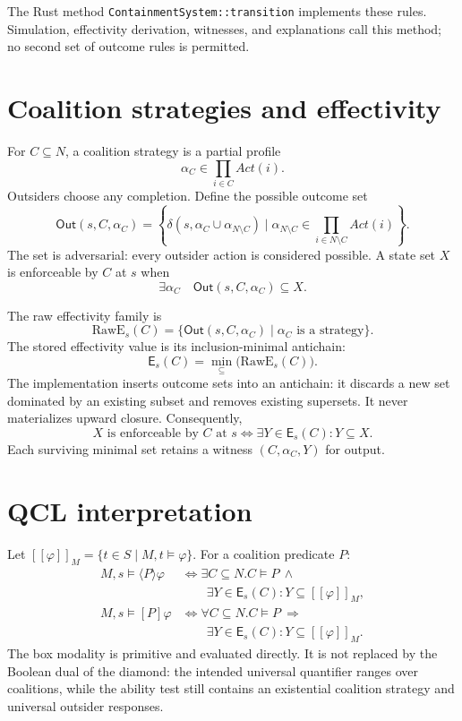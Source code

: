 \documentclass[11pt]{article}
\newcommand{\Agents}{\mathit{N}}
\newcommand{\States}{\mathit{S}}
\newcommand{\Act}{\mathit{Act}}
\newcommand{\Out}{\mathsf{Out}}
\newcommand{\Eff}{\mathsf{E}}
\newcommand{\denote}[1]{\left[\!\left[ #1 \right]\!\right]}
\begin{document}
The Rust method \texttt{ContainmentSystem::transition} implements these rules.
Simulation, effectivity derivation, witnesses, and explanations call this
method; no second set of outcome rules is permitted.

\section{Coalition strategies and effectivity}

For $C\subseteq\Agents$, a coalition strategy is a partial profile
\[
  \alpha_C\in\prod_{i\in C}\Act(i).
\]
Outsiders choose any completion. Define the possible outcome set
\[
 \Out(s,C,\alpha_C)=
 \left\{\delta(s,\alpha_C\cup\alpha_{\Agents\setminus C})\mid
 \alpha_{\Agents\setminus C}\in
 \prod_{i\in\Agents\setminus C}\Act(i)\right\}.
\]
The set is adversarial: every outsider action is considered possible. A state
set $X$ is enforceable by $C$ at $s$ when
\[
 \exists\alpha_C\quad \Out(s,C,\alpha_C)\subseteq X.
\]

The raw effectivity family is
\[
 \mathrm{RawE}_s(C)=\{\Out(s,C,\alpha_C)\mid\alpha_C\text{ is a strategy}\}.
\]
The stored effectivity value is its inclusion-minimal antichain:
\[
 \Eff_s(C)=\min_{\subseteq}\bigl(\mathrm{RawE}_s(C)\bigr).
\]
The implementation inserts outcome sets into an antichain: it discards a new
set dominated by an existing subset and removes existing supersets. It never
materializes upward closure. Consequently,
\[
 X\text{ is enforceable by }C\text{ at }s
 \iff \exists Y\in\Eff_s(C):Y\subseteq X.
\]
Each surviving minimal set retains a witness $(C,\alpha_C,Y)$ for output.

\section{QCL interpretation}

Let $\denote{\varphi}_M=\{t\in\States\mid M,t\models\varphi\}$.
For a coalition predicate $P$:
\begin{align*}
 M,s\models\langle P\rangle\varphi
 &\iff \exists C\subseteq\Agents.
 C\models P\ \land\ \\
 &\qquad\exists Y\in\Eff_s(C):Y\subseteq
 \denote{\varphi}_M,\\[3pt]
 M,s\models[P]\varphi
 &\iff \forall C\subseteq\Agents.
 C\models P\ \Longrightarrow\ \\
 &\qquad\exists Y\in\Eff_s(C):Y\subseteq
 \denote{\varphi}_M.
\end{align*}
The box modality is primitive and evaluated directly. It is not replaced by
the Boolean dual of the diamond: the intended universal quantifier ranges
over coalitions, while the ability test still contains an existential
coalition strategy and universal outsider responses.
\end{document}
